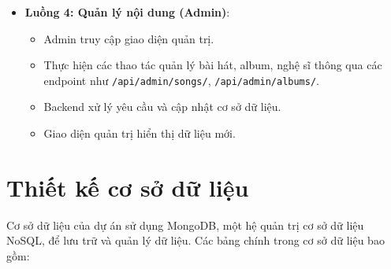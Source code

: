\begin{itemize}
    \item \textbf{Luồng 4: Quản lý nội dung (Admin)}:
    \begin{itemize}
        \item Admin truy cập giao diện quản trị.
        \item Thực hiện các thao tác quản lý bài hát, album, nghệ sĩ thông qua các endpoint như \texttt{/api/admin/songs/}, \texttt{/api/admin/albums/}.
        \item Backend xử lý yêu cầu và cập nhật cơ sở dữ liệu.
        \item Giao diện quản trị hiển thị dữ liệu mới.
    \end{itemize}
\end{itemize}
\section{Thiết kế cơ sở dữ liệu}
Cơ sở dữ liệu của dự án sử dụng MongoDB, một hệ quản trị cơ sở dữ liệu NoSQL, để lưu trữ và quản lý dữ liệu. Các bảng chính trong cơ sở dữ liệu bao gồm:


